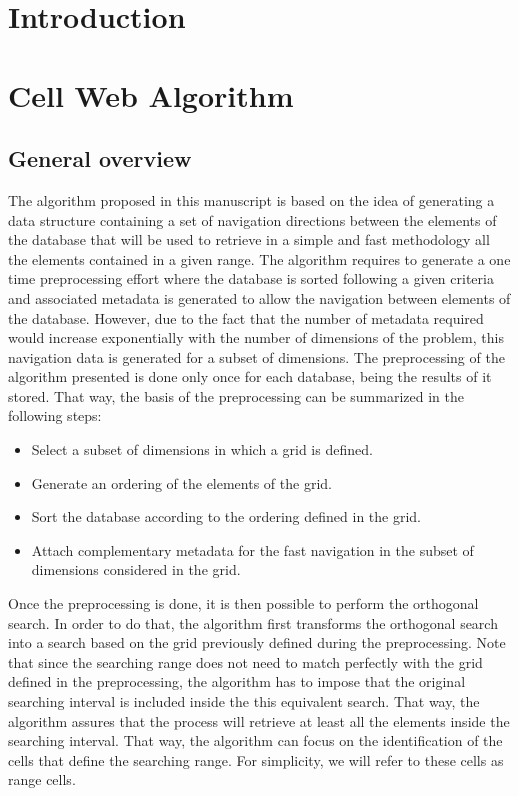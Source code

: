 \documentclass[preprint,12pt]{elsarticle}
\begin{document}

\section{Introduction}
\label{sec:intro}


\section{Cell Web Algorithm}
\label{sec:algorithm}

\subsection{General overview}
\label{sec:idea}

The algorithm proposed in this manuscript is based on the idea of generating a data structure containing a set of navigation directions between the elements of the database that will be used to retrieve in a simple and fast methodology all the elements contained in a given range. The algorithm requires to generate a one time preprocessing effort where the database is sorted following a given criteria and associated metadata is generated to allow the navigation between elements of the database. However, due to the fact that the number of metadata required would increase exponentially with the number of dimensions of the problem, this navigation data is generated for a subset of dimensions. The preprocessing of the algorithm presented is done only once for each database, being the results of it stored. That way, the basis of the preprocessing can be summarized in the following steps:
\begin{itemize}
  \item Select a subset of dimensions in which a grid is defined.
  \item Generate an ordering of the elements of the grid.
  \item Sort the database according to the ordering defined in the grid.
  \item Attach complementary metadata for the fast navigation in the subset of dimensions considered in the grid.
\end{itemize}

Once the preprocessing is done, it is then possible to perform the orthogonal search. In order to do that, the algorithm first transforms the orthogonal search into a search based on the grid previously defined during the preprocessing. Note that since the searching range does not need to match perfectly with the grid defined in the preprocessing, the algorithm has to impose that the original searching interval is included inside the this equivalent search. That way, the algorithm assures that the process will retrieve at least all the elements inside the searching interval. That way, the algorithm can focus on the identification of the cells that define the searching range. For simplicity, we will refer to these cells as range cells.
\end{document}
